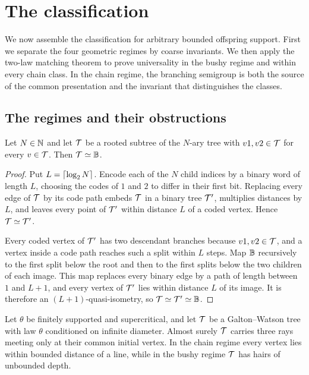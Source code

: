 \chapter{The classification}
\label{ch:trichotomy}

We now assemble the classification for arbitrary bounded offspring support. First we separate the
four geometric regimes by coarse invariants. We then apply the two-law matching theorem to prove
universality in the bushy regime and within every chain class. In the chain regime, the branching
semigroup is both the source of the common presentation and the invariant that distinguishes the
classes.

\section{The regimes and their obstructions}

\begin{proposition}
\label{thm:bushy}
\leanok
{}
Let $N\in\mathbb{N}$ and let $\mathcal{T}$ be a rooted subtree of the $N$-ary tree with $v1,v2\in\mathcal{T}$ for
every $v\in\mathcal{T}$. Then $\mathcal{T}\simeq\mathbb{B}$.
\end{proposition}

\begin{proof}
\leanok
{}
Put $L=\lceil \log_2N \rceil$. Encode each of the $N$ child indices by a binary word of length $L$,
choosing the codes of $1$ and $2$ to differ in their first bit. Replacing every edge of $\mathcal{T}$
by its code path embeds $\mathcal{T}$ in a binary tree $\mathcal{T}'$, multiplies distances by $L$, and leaves
every point of $\mathcal{T}'$ within distance $L$ of a coded vertex. Hence $\mathcal{T}\simeq\mathcal{T}'$.

Every coded vertex of $\mathcal{T}'$ has two descendant branches because $v1,v2\in\mathcal{T}$, and a vertex
inside a code path reaches such a split within $L$ steps. Map $\mathbb{B}$ recursively to the first
split below the root and then to the first splits below the two children of each image. This map
replaces every binary edge by a path of length between $1$ and $L+1$, and every vertex of
$\mathcal{T}'$ lies within distance $L$ of its image. It is therefore an $(L+1)$-quasi-isometry, so
$\mathcal{T}\simeq\mathcal{T}'\simeq\mathbb{B}$.
\end{proof}

\begin{lemma}
\label{thm:regime-obstructions-general}
\leanok
Let $\theta$ be finitely supported and supercritical, and let $\mathcal{T}$ be a Galton--Watson tree
with law $\theta$ conditioned on infinite diameter. Almost surely $\mathcal{T}$ carries three rays
meeting only at their common initial vertex. In the chain regime every vertex lies within
bounded distance of a line, while in the bushy regime $\mathcal{T}$ has hairs of unbounded depth.
\end{lemma}

